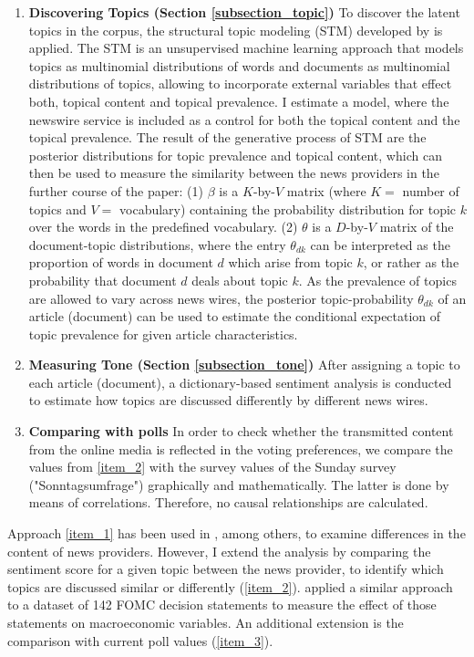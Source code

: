\documentclass[12pt,a4paper,notitlepage]{article}
\begin{document}
\begin{enumerate}
	\item\label{item_1} \textbf{Discovering Topics (Section \ref{subsection_topic})} To discover the latent topics in the corpus, the structural topic modeling (STM) developed by \citet{roberts_model_2016} is applied. The STM is an unsupervised machine learning approach that models topics as multinomial distributions of words and documents as multinomial distributions of topics, allowing to incorporate external variables that effect both, topical content and topical prevalence. I estimate a model, where the newswire service is included as a control for both the topical content and the topical prevalence. The result of the generative process of STM are the posterior distributions for topic prevalence and topical content, which can then be used to measure the similarity between the news providers in the further course of the paper: (1) $\beta$ is a $K$-by-$V$ matrix (where $K=$ number of topics and $V=$ vocabulary) containing the probability distribution for topic $k$ over the words in the predefined vocabulary. (2) $\theta$ is a $D$-by-$V$ matrix of the document-topic distributions, where the entry $\theta_{dk}$ can be interpreted as the proportion of words in document $d$ which arise from topic $k$, or rather as the probability that document $d$ deals about topic $k$. As the prevalence of topics are allowed to vary across news wires, the posterior topic-probability $\theta_{dk}$ of an article (document) can be used to estimate the conditional expectation of topic prevalence for given article characteristics. 
	\item\label{item_2} \textbf{Measuring Tone (Section \ref{subsection_tone})} After assigning a topic to each article (document), a dictionary-based sentiment analysis is conducted to estimate how topics are discussed differently by different news wires.
	\item\label{item_3} \textbf{Comparing with polls} In order to check whether the transmitted content from the online media is reflected in the voting preferences, we compare the values from \ref{item_2} with the survey values of the Sunday survey ("Sonntagsumfrage") graphically and mathematically. The latter is done by means of correlations. Therefore, no causal relationships are calculated.
	
\end{enumerate}

Approach \ref{item_1} has been used in \citet{roberts_model_2016}, among others, to examine differences in the content of news providers. However, I extend the analysis by comparing the sentiment score for a given topic between the news provider, to identify which topics are discussed similar or differently (\ref{item_2}). \citet{hansen_shocking_2016} applied a similar approach to a dataset of 142 FOMC decision statements to measure the effect of those statements on macroeconomic variables. An additional extension is the comparison with current poll values (\ref{item_3}). 
\end{document}

